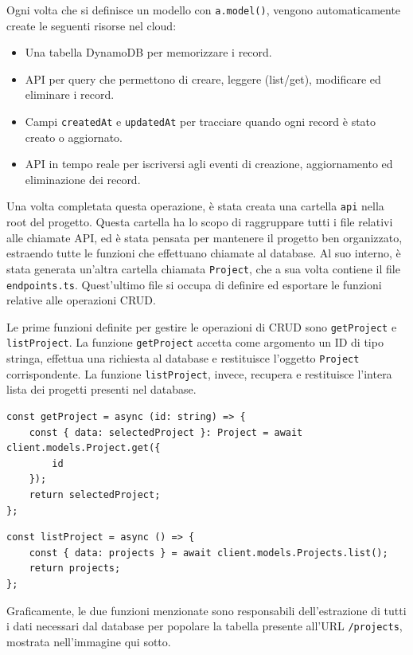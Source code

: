 \documentclass[target=bach,aauheader=,style=]{thud}
\begin{document}
\noindent Ogni volta che si definisce un modello con \texttt{a.model()}, vengono automaticamente create le seguenti risorse nel cloud:
\begin{itemize}
    \item Una tabella DynamoDB per memorizzare i record.
    \item API per query che permettono di creare, leggere (list/get), modificare ed eliminare i record.
    \item Campi \texttt{createdAt} e \texttt{updatedAt} per tracciare quando ogni record è stato creato o aggiornato.
    \item API in tempo reale per iscriversi agli eventi di creazione, aggiornamento ed eliminazione dei record.
\end{itemize}
\noindent Una volta completata questa operazione, è stata creata una cartella \texttt{api} nella root del progetto. Questa cartella ha lo scopo di raggruppare tutti i file relativi alle chiamate API, ed è stata pensata per mantenere il progetto ben organizzato, estraendo tutte le funzioni che effettuano chiamate al database. Al suo interno, è stata generata un'altra cartella chiamata \texttt{Project}, che a sua volta contiene il file \texttt{endpoints.ts}. Quest'ultimo file si occupa di definire ed esportare le funzioni relative alle operazioni CRUD. 

\noindent Le prime funzioni definite per gestire le operazioni di CRUD sono \texttt{getProject} e \texttt{listProject}. La funzione \texttt{getProject} accetta come argomento un ID di tipo stringa, effettua una richiesta al database e restituisce l'oggetto \texttt{Project} corrispondente. La funzione \texttt{listProject}, invece, recupera e restituisce l'intera lista dei progetti presenti nel database.

\begin{lstlisting}[caption=funzione \texttt{getProject}]
const getProject = async (id: string) => {
    const { data: selectedProject }: Project = await client.models.Project.get({
        id
    });
    return selectedProject;
};
\end{lstlisting}

\begin{lstlisting}[caption=funzione \texttt{listProject}]
const listProject = async () => {
    const { data: projects } = await client.models.Projects.list();
    return projects;
};
\end{lstlisting}

\noindent Graficamente, le due funzioni menzionate sono responsabili dell'estrazione di tutti i dati necessari dal database per popolare la tabella presente all'URL \texttt{/projects}, mostrata nell'immagine qui sotto.
\end{document}
